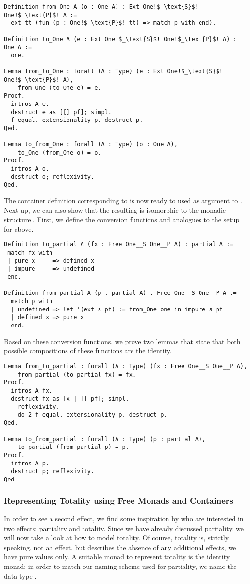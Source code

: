 \begin{verbatim}
Definition from_One A (o : One A) : Ext One!$_\text{S}$! One!$_\text{P}$! A :=
  ext tt (fun (p : One!$_\text{P}$! tt) => match p with end).

Definition to_One A (e : Ext One!$_\text{S}$! One!$_\text{P}$! A) : One A :=
  one.

Lemma from_to_One : forall (A : Type) (e : Ext One!$_\text{S}$! One!$_\text{P}$! A),
    from_One (to_One e) = e.
Proof.
  intros A e.
  destruct e as [[] pf]; simpl.
  f_equal. extensionality p. destruct p.
Qed.

Lemma to_from_One : forall (A : Type) (o : One A),
    to_One (from_One o) = o.
Proof.
  intros A o.
  destruct o; reflexivity.
Qed.
\end{verbatim}

The container definition corresponding to  is now ready to used as argument to .
Next up, we can also show that the resulting   is isomorphic to the monadic structure .
First, we define the conversion functions  and  analogues to the setup for  above.

\begin{verbatim}
Definition to_partial A (fx : Free One__S One__P A) : partial A :=
 match fx with
 | pure x     => defined x
 | impure _ _ => undefined
 end.

Definition from_partial A (p : partial A) : Free One__S One__P A :=
  match p with
  | undefined => let '(ext s pf) := from_One one in impure s pf
  | defined x => pure x
  end.
\end{verbatim}

Based on these conversion functions, we prove two lemmas that state that both possible compositions of these functions are the identity.

\begin{verbatim}
Lemma from_to_partial : forall (A : Type) (fx : Free One__S One__P A),
    from_partial (to_partial fx) = fx.
Proof.
  intros A fx.
  destruct fx as [x | [] pf]; simpl.
  - reflexivity.
  - do 2 f_equal. extensionality p. destruct p.
Qed.

Lemma to_from_partial : forall (A : Type) (p : partial A),
    to_partial (from_partial p) = p.
Proof.
  intros A p.
  destruct p; reflexivity.
Qed.
\end{verbatim}

\subsubsection{Representing Totality using Free Monads and Containers}
\label{subsub:totality_container}
In order to see a second effect, we find some inspiration by \citet{abel2005verifying} who are interested in two effects: partiality and totality.
Since we have already discussed partiality, we will now take a look at how to model totality.
Of course, totality is, strictly speaking, not an effect, but describes the absence of any additional effects, we have pure values only.
A suitable monad to represent totality is the identity monad; in order to match our naming scheme used for partiality, we name the data type .

